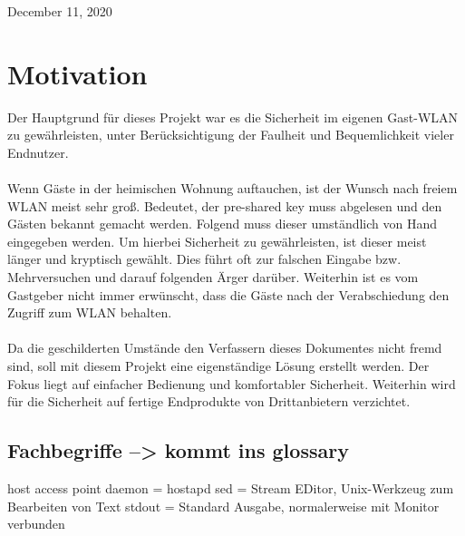 \documentclass[a4paper,11pt,singlespacing]{article}
\begin{document}
\begin{titlepage}
\begin{center}
        \vspace{2.0cm}
        December 11, 2020
        
        \vspace{0.8cm}
          
            
        \end{center}
    \end{titlepage}
    	

    	
    	\tableofcontents
    	\newpage
    	
    
    	
    	
    	
    \section{Motivation}
    	Der Hauptgrund für dieses Projekt war es die Sicherheit im eigenen Gast-WLAN zu gewährleisten, unter Berücksichtigung der Faulheit und Bequemlichkeit vieler Endnutzer. \\ \\
    	Wenn Gäste in der heimischen Wohnung auftauchen, ist der Wunsch nach freiem WLAN meist sehr groß. Bedeutet, der pre-shared key muss abgelesen und den Gästen bekannt gemacht werden. Folgend muss dieser umständlich von Hand eingegeben werden. Um hierbei Sicherheit zu gewährleisten, ist dieser meist länger und kryptisch gewählt. Dies führt oft zur falschen Eingabe bzw. Mehrversuchen und darauf folgenden Ärger darüber. Weiterhin ist es vom Gastgeber nicht immer erwünscht, dass die Gäste nach der Verabschiedung den Zugriff zum WLAN behalten. \\ \\
    	Da die geschilderten Umstände den Verfassern dieses Dokumentes nicht fremd sind, soll mit diesem Projekt eine eigenständige Lösung erstellt werden. Der Fokus liegt auf einfacher Bedienung und komfortabler Sicherheit. Weiterhin wird für die Sicherheit auf fertige Endprodukte von Drittanbietern verzichtet. 
    	
      
        
    	
    	\subsection{Fachbegriffe --> kommt ins glossary} 
    	host access point daemon = hostapd
    	sed = Stream EDitor, Unix-Werkzeug zum Bearbeiten von Text
    	stdout = Standard Ausgabe, normalerweise mit Monitor verbunden
    	
    	
\end{document}
